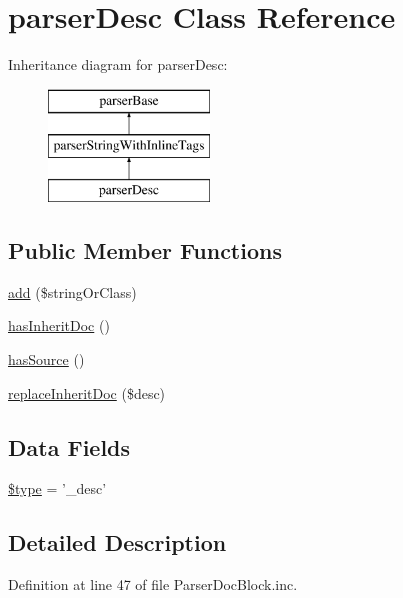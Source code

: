 \hypertarget{classparser_desc}{\section{parser\-Desc \-Class \-Reference}
\label{classparser_desc}
}
\-Inheritance diagram for parser\-Desc\-:\begin{figure}[H]
\begin{center}
\leavevmode
\includegraphics[height=3.000000cm]{classparser_desc}
\end{center}
\end{figure}
\subsection*{\-Public \-Member \-Functions}
\begin{DoxyCompactItemize}
\item 
\hyperlink{classparser_desc_ad76d9180b525693349995e809027225c}{add} (\$string\-Or\-Class)
\item 
\hyperlink{classparser_desc_aa7db01ece1b87c335aa3d3d66e9cef68}{has\-Inherit\-Doc} ()
\item 
\hyperlink{classparser_desc_a48be422d378408248f760a11fd42f1f1}{has\-Source} ()
\item 
\hyperlink{classparser_desc_a517803859430dc475e50866420aed322}{replace\-Inherit\-Doc} (\$desc)
\end{DoxyCompactItemize}
\subsection*{\-Data \-Fields}
\begin{DoxyCompactItemize}
\item 
\hyperlink{classparser_desc_a9a4a6fba2208984cabb3afacadf33919}{\$type} = '\-\_\-desc'
\end{DoxyCompactItemize}


\subsection{\-Detailed \-Description}


\-Definition at line 47 of file \-Parser\-Doc\-Block.\-inc.



